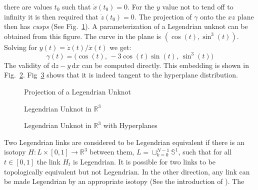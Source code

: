 \documentclass{article}
\theoremstyle{plain}
\begin{document}
        there are values $t_{0}$ such that $\dot{x}(t_{0})=0$. For the $y$
        value not to tend off to infinity it is then required that
        $\dot{z}(t_{0})=0$. The projection of $\gamma$ onto the $xz$ plane then
        has \textit{cusps} (See Fig.~\ref{fig:legendrian_unknot_cusps_001}).
        A parameterization of a Legendrian unknot can be obtained from this
        figure. The curve in the plane is $(\cos(t),\sin^{3}(t))$. Solving for
        $y(t)=\dot{z}(t)/\dot{x}(t)$ we get:
        \begin{equation}
            \gamma(t)=\Big(\cos(t),\,-3\cos(t)\sin(t),\,\sin^{3}(t)\Big)
        \end{equation}
        The validity of $\textrm{d}z-y\,\textrm{d}x$ can be computed directly.
        This embedding is shown in
        Fig.~\ref{fig:legendrian_unknot_001}.
        Fig~\ref{fig:legendrian_unknot_002} shows that it is indeed tangent to
        the hyperplane distribution.
        \begin{figure}
            \centering
            \caption{Projection of a Legendrian Unknot}
            \label{fig:legendrian_unknot_cusps_001}
        \end{figure}
        \begin{figure}
            \centering
            \caption{Legendrian Unknot in $\mathbb{R}^{3}$}
            \label{fig:legendrian_unknot_001}
        \end{figure}
        \begin{figure}
            \centering
            \caption{Legendrian Unknot in $\mathbb{R}^{3}$ with Hyperplanes}
            \label{fig:legendrian_unknot_002}
        \end{figure}
        Two Legendrian links are considered to be Legendrian equivalent if
        there is an isotopy $H:L\times[0,1]\rightarrow\mathbb{R}^{3}$ between
        them, $L=\sqcup_{k=0}^{N-1}\mathbb{S}^{1}$, such that for all
        $t\in[0,1]$ the link $H_{t}$ is Legendrian. It is possible for two links
        to be topologically equivalent but not Legendrian. In the other
        direction, any link can be made Legendrian by an appropriate isotopy
        (See the introduction of \cite{VeraVertessiTransNonSimpleKnots}). The
\end{document}
